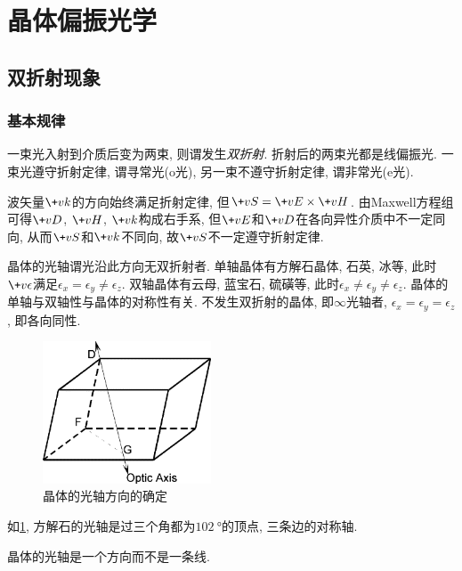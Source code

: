 \documentclass{ctexart}
\begin{document}
\section{晶体偏振光学} %
\label{sec:晶体偏振光学}

\subsection{双折射现象} %
\label{sub:双折射现象}

\subsubsection{基本规律} %
\label{ssub:基本规律}

一束光入射到介质后变为两束, 则谓发生\emph{双折射}. 折射后的两束光都是线偏振光. 一束光遵守折射定律, 谓寻常光(o光), 另一束不遵守折射定律, 谓非常光(e光).
\par
波矢量$\+vk$的方向始终满足折射定律, 但$\+vS = \+vE\times \+vH$. 由Maxwell方程组可得$\+vD$, $\+vH$, $\+vk$构成右手系, 但$\+vE$和$\+vD$在各向异性介质中不一定同向, 从而$\+vS$和$\+vk$不同向, 故$\+vS$不一定遵守折射定律.
\par
晶体的光轴谓光沿此方向无双折射者. 单轴晶体有方解石晶体, 石英, 冰等, 此时$\+v\epsilon$满足$\epsilon_x = \epsilon_y \neq \epsilon_z$. 双轴晶体有云母, 蓝宝石, 硫磺等, 此时$\epsilon_x \neq \epsilon_y \neq \epsilon_z$. 晶体的单轴与双轴性与晶体的对称性有关. 不发生双折射的晶体, 即$\infty$光轴者, $\epsilon_x = \epsilon_y = \epsilon_z$, 即各向同性.
\par
\begin{figure}[ht]
    \centering
    \includegraphics[width=5cm]{src/OpticAxisEg.png}
    \caption{晶体的光轴方向的确定}
    \label{fig:晶体的光轴方向的确定}
\end{figure}
\begin{ex}
    如\cref{fig:晶体的光轴方向的确定}, 方解石的光轴是过三个角都为$\SI{102}{\degree}$的顶点, 三条边的对称轴.
\end{ex}
\begin{pitfall}
    晶体的光轴是一个方向而不是一条线.
\end{pitfall}
\end{document}
